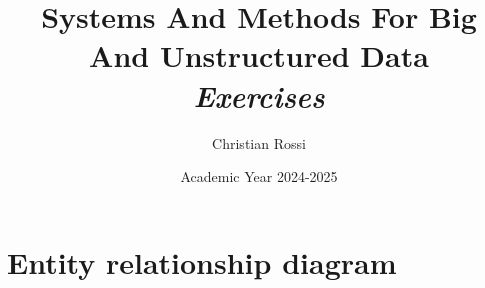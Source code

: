 \documentclass[12pt, a4paper]{report}
\title{\textbf{Systems And Methods For Big And Unstructured Data} \\ \textit{Exercises}}
\author{Christian Rossi}
\date{Academic Year 2024-2025}
\begin{document}
    \maketitle

    

    \cleardoublepage

    \tableofcontents

    \cleardoublepage

    \chapter{Entity relationship diagram}
    
    

    
\end{document}
